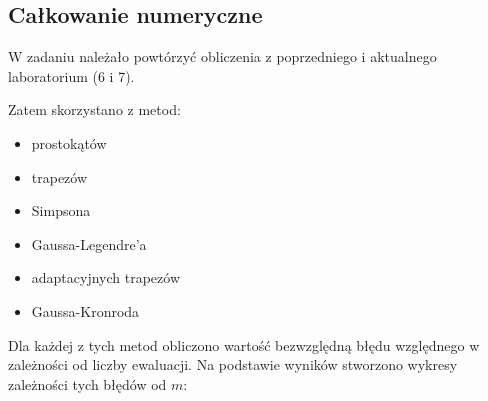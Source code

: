 \documentclass{article}
\begin{document}
	\subsection*{Całkowanie numeryczne}

	W zadaniu należało powtórzyć obliczenia z poprzedniego i aktualnego laboratorium (6 i 7). 

	Zatem skorzystano z metod:
	\begin{itemize}
		\item prostokątów
		\item trapezów
		\item Simpsona
		\item Gaussa-Legendre'a
		\item adaptacyjnych trapezów
		\item Gaussa-Kronroda
	\end{itemize}

	Dla każdej z tych metod obliczono wartość bezwzględną błędu względnego w zależności od liczby ewaluacji. Na podstawie wyników stworzono wykresy zależności tych błędów od $m$:
	
	
	
	
	
	
	
	
	
	
	
	
	
	
\end{document}
